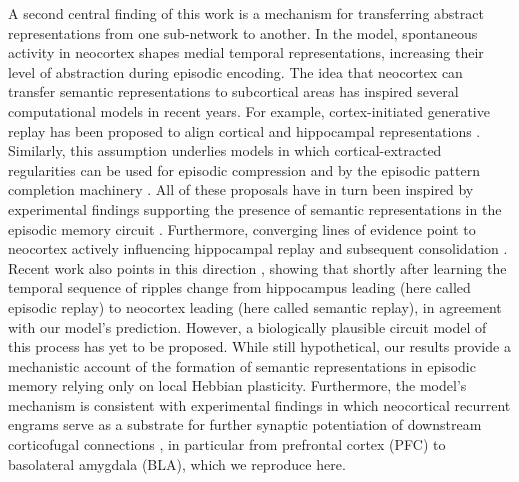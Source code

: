 \documentclass{article}
\begin{document}
\newline\newline
A second central finding of this work is a mechanism for transferring abstract representations from one sub-network to another. In the model, spontaneous activity in neocortex shapes medial temporal representations, increasing their level of abstraction during episodic encoding. The idea that neocortex can transfer semantic representations to subcortical areas has inspired several computational models in recent years. For example, cortex-initiated generative replay has been proposed to align cortical and hippocampal representations . Similarly, this assumption underlies models in which cortical-extracted regularities can be used for episodic compression  and by the episodic pattern completion machinery . All of these proposals have in turn been inspired by experimental findings supporting the presence of semantic representations in the episodic memory circuit . Furthermore, converging lines of evidence point to neocortex actively influencing hippocampal replay and subsequent consolidation . Recent work also points in this direction , showing that shortly after learning the temporal sequence of ripples change from hippocampus leading (here called episodic replay) to neocortex leading (here called semantic replay), in agreement with our model's prediction. However, a biologically plausible circuit model of this process has yet to be proposed. While still hypothetical, our results provide a mechanistic account of the formation of semantic representations in episodic memory relying only on local Hebbian plasticity. Furthermore, the model's mechanism is consistent with experimental findings in which neocortical recurrent engrams serve as a substrate for further synaptic potentiation of downstream corticofugal connections , in particular from prefrontal cortex (PFC) to basolateral amygdala (BLA), which we reproduce here.
\newline\newline
\end{document}
